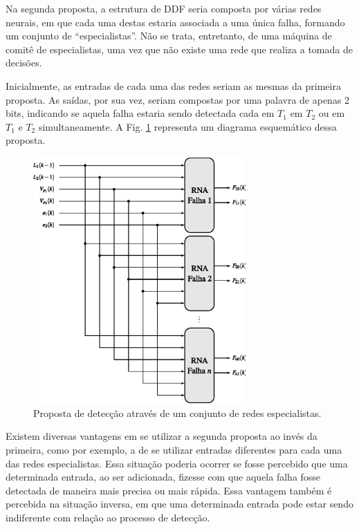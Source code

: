 Na segunda proposta, a estrutura de DDF seria composta por várias redes neurais,
em que cada uma destas estaria associada a uma única falha, formando um conjunto
de ``especialistas''. Não se trata, entretanto, de uma máquina de comitê de
especialistas, uma vez que não existe uma rede que realiza a tomada de decisões. 

Inicialmente, as entradas de cada uma das redes seriam as mesmas da primeira
proposta. As saídas, por sua vez, seriam compostas por uma palavra de apenas 2
bits, indicando se aquela falha estaria sendo detectada cada em $T_1$ em $T_2$
ou em $T_1$ e $T_2$ simultaneamente. A Fig. \ref{fig:detec_prop_2} representa um
diagrama esquemático dessa proposta.

\begin{figure}[!htb]
\centering
    \includegraphics[width=0.725\textwidth]{imgs/sistema/eps/detec_prop_2}
    \caption{Proposta de detecção através de um conjunto de redes
             especialistas.}
    \label{fig:detec_prop_2}
\end{figure}

Existem diversas vantagens em se utilizar a segunda proposta ao invés da
primeira, como por exemplo, a de se utilizar entradas diferentes para cada uma
das redes especialistas. Essa situação poderia ocorrer se fosse percebido que
uma determinada entrada, ao ser adicionada, fizesse com que aquela falha fosse
detectada de maneira mais precisa ou mais rápida. Essa vantagem também é
percebida na situação inversa, em que uma determinada entrada pode estar sendo
indiferente com relação ao processo de detecção.

